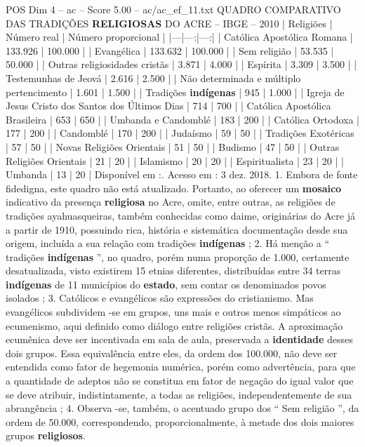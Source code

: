 \begin{textsample}{POS Dim 4 – ac – Score 5.00 – ac/ac\_ef\_11.txt}  \label{ex:f4_pos_248}
QUADRO COMPARATIVO DAS TRADIÇÕES \textbf{RELIGIOSAS} DO ACRE – IBGE – 2010 | Religiões | Número real | Número proporcional | |---|---:|---:| | Católica Apostólica Romana | 133.926 | 100.000 | | Evangélica | 133.632 | 100.000 | | Sem religião | 53.535 | 50.000 | | Outras religiosidades cristãs | 3.871 | 4.000 | | Espírita | 3.309 | 3.500 | | Testemunhas de Jeová | 2.616 | 2.500 | | Não determinada e múltiplo pertencimento | 1.601 | 1.500 | | Tradições \textbf{indígenas} | 945 | 1.000 | | Igreja de Jesus Cristo dos Santos dos Últimos Dias | 714 | 700 | | Católica Apostólica Brasileira | 653 | 650 | | Umbanda e Candomblé | 183 | 200 | | Católica Ortodoxa | 177 | 200 | | Candomblé | 170 | 200 | | Judaísmo | 59 | 50 | | Tradições Exotéricas | 57 | 50 | | Novas Religiões Orientais | 51 | 50 | | Budismo | 47 | 50 | | Outras Religiões Orientais | 21 | 20 | | Islamismo | 20 | 20 | | Espiritualista | 23 | 20 | | Umbanda | 13 | 20 | Disponível em :.
Acesso em : 3 dez. 2018. 1.
Embora de fonte fidedigna, este quadro não está atualizado.
Portanto, ao oferecer um \textbf{mosaico} indicativo da presença \textbf{religiosa} no Acre, omite, entre outras, as religiões de tradições ayahuasqueiras, também conhecidas como daime, originárias do Acre já a partir de 1910, possuindo rica, história e sistemática documentação desde sua origem, incluída a sua relação com tradições \textbf{indígenas} ; 2.
Há menção a “ tradições \textbf{indígenas} ”, no quadro, porém numa proporção de 1.000, certamente desatualizada, visto existirem 15 etnias diferentes, distribuídas entre 34 terras \textbf{indígenas} de 11 municípios do \textbf{estado}, sem contar os denominados povos isolados ; 3.
Católicos e evangélicos são expressões do cristianismo.
Mas evangélicos subdividem -se em grupos, uns mais e outros menos simpáticos ao ecumenismo, aqui definido como diálogo entre religiões cristãs.
A aproximação ecumênica deve ser incentivada em sala de aula, preservada a \textbf{identidade} desses dois grupos.
Essa equivalência entre eles, da ordem dos 100.000, não deve ser entendida como fator de hegemonia numérica, porém como advertência, para que a quantidade de adeptos não se constitua em fator de negação do igual valor que se deve atribuir, indistintamente, a todas as religiões, independentemente de sua abrangência ; 4.
Observa -se, também, o acentuado grupo dos “ Sem religião ”, da ordem de 50.000, correspondendo, proporcionalmente, à metade dos dois maiores grupos \textbf{religiosos}.

\end{textsample}

